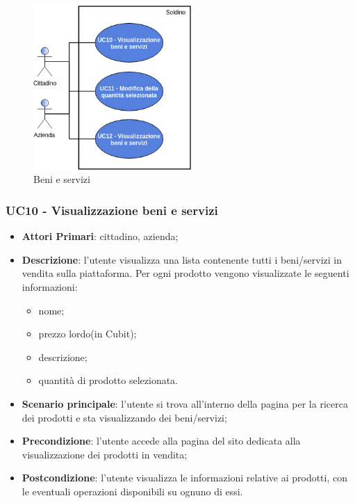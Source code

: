 \begin{figure}[H]
	\includegraphics[width=6cm]{res/images/benieservizi.png}
	\centering
	\caption{Beni e servizi}
\end{figure}
\subsubsection{UC10 - Visualizzazione beni e servizi}

 \begin{itemize}
 	\item \textbf{Attori Primari}: cittadino, azienda;
 	\item \textbf{Descrizione}: l'utente visualizza una lista contenente tutti i beni/servizi in vendita sulla piattaforma. Per ogni prodotto vengono visualizzate le seguenti informazioni:
 	\begin{itemize}
 		\item nome;
 		\item prezzo lordo\glosp (in Cubit\glo);
 		\item descrizione;
 		\item quantità di prodotto selezionata.
 	\end{itemize}
 	
 	\item \textbf{Scenario principale}: l'utente si trova all'interno della pagina per la ricerca dei prodotti e sta visualizzando dei beni/servizi;	
 	\item \textbf{Precondizione}: l'utente accede alla pagina del sito dedicata alla visualizzazione dei prodotti in vendita;
 	\item \textbf{Postcondizione}: l'utente visualizza le informazioni relative ai prodotti, con le eventuali operazioni disponibili su ognuno di essi.
 \end{itemize}

